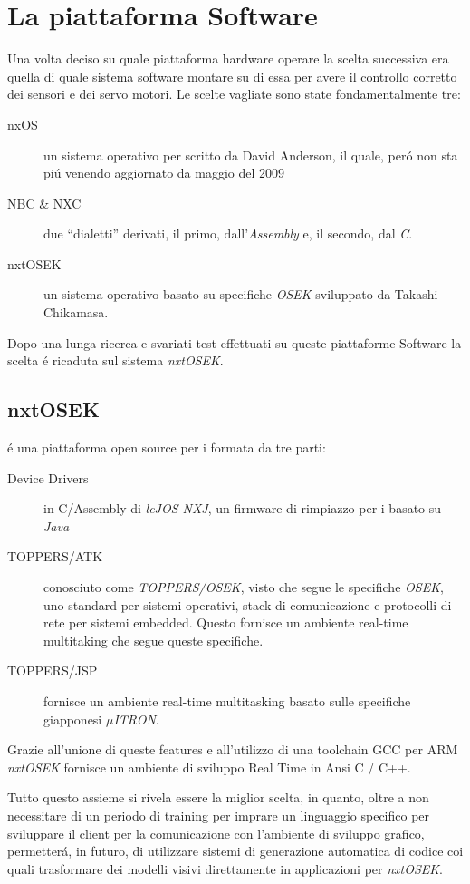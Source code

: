 \section{La piattaforma Software}
Una volta deciso su quale piattaforma hardware operare la scelta successiva
era quella di quale sistema software montare su di essa per avere il
controllo corretto dei sensori e dei servo motori. Le scelte vagliate sono
state fondamentalmente tre:
\begin{description}
    \item[nxOS]\cite{bib:nxos}un sistema operativo per \nxt{} scritto da David Anderson,
    il quale, per\'o non sta pi\'u venendo aggiornato da maggio del 2009
    \item[NBC \& NXC]\cite{bib:nbcnxc}due ``dialetti'' derivati, il primo,
    dall'\emph{Assembly} e, il secondo, dal \emph{C}.
    \item[nxtOSEK]un sistema operativo basato su specifiche \emph{OSEK}
    sviluppato da Takashi Chikamasa.
\end{description}
Dopo una lunga ricerca e svariati test effettuati su queste piattaforme
Software la scelta \'e ricaduta sul sistema \emph{nxtOSEK}.

\subsection{nxtOSEK}
\nxtOSEK{}\cite{bib:nxtosek} \'e una piattaforma open source per i \nxt{} formata da tre
parti:
\begin{description}
    \item[Device Drivers]in C/Assembly di \emph{leJOS NXJ}, un firmware di
        rimpiazzo per i \nxt{} basato su \emph{Java}
    \item[TOPPERS/ATK]conosciuto come \emph{TOPPERS/OSEK}, visto che
        segue le specifiche \emph{OSEK}\cite{bib:osek}, uno standard per sistemi
        operativi, stack di comunicazione e protocolli di rete per sistemi
        embedded. Questo fornisce un ambiente real-time multitaking che
        segue queste specifiche.
    \item[TOPPERS/JSP]fornisce un ambiente real-time multitasking basato
        sulle specifiche giapponesi \emph{$\mu$ITRON}\cite{bib:muitron}.
\end{description}
Grazie all'unione di queste features e all'utilizzo di una toolchain GCC
per ARM \emph{nxtOSEK} fornisce un ambiente di sviluppo Real Time in Ansi C
/ C++.

Tutto questo assieme si rivela essere la miglior scelta, in quanto, oltre
a non necessitare di un periodo di training per imprare un linguaggio
specifico per sviluppare il client per la comunicazione con l'ambiente di
sviluppo grafico, permetter\'a, in futuro, di utilizzare sistemi di
generazione automatica di codice coi quali trasformare dei modelli visivi
direttamente in applicazioni per \emph{nxtOSEK}.

